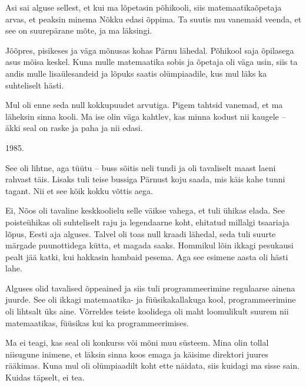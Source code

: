 
Asi sai alguse sellest, et kui ma lõpetasin põhikooli, siis 
matemaatikaõpetaja arvas, et peaksin minema Nõkku edasi õppima. Ta suutis mu vanemaid veenda, et see on suurepärane 
mõte, ja ma läksingi.


Jõõpres, pisikeses ja väga mõnusas kohas Pärnu 
lähedal. Põhikool saja õpilasega asus mõisa keskel. Kuna mulle matemaatika 
sobis ja õpetaja oli väga usin, siis ta andis mulle lisaülesandeid 
ja lõpuks saatis olümpiaadile, kus mul läks ka suhteliselt hästi.



Mul oli enne seda null kokkupuudet arvutiga. Pigem tahtsid vanemad, et ma läheksin sinna kooli. Ma ise olin väga kahtlev, kas minna kodust 
nii kaugele – äkki seal on raske ja paha ja nii edasi. 


1985. 


See oli lihtne, aga tüütu – buss sõitis neli tundi 
ja oli tavaliselt maast laeni rahvast täis. Lisaks tuli teise bussiga Pärnust koju saada, mis
käis kahe tunni tagant. Nii et see kõik kokku võttis aega.  


Ei, Nõos oli tavaline keskkoolielu selle väikse vahega, et tuli ühikas 
elada. See poisteühikas oli 
suhteliselt raju ja legendaarne koht, ehitatud millalgi tsaariaja lõpus, Eesti 
aja alguses. Talvel oli toas null kraadi lähedal, seda tuli suurte 
märgade puunottidega kütta, et magada saaks. Hommikul lõin ikkagi pesukausi pealt jää katki, 
kui hakkasin hambaid pesema. Aga see esimene aasta oli hästi lahe. 

Alguses olid tavalised õppeained ja siis tuli programmeerimine 
regulaarse ainena juurde. See oli ikkagi matemaatika- ja 
füüsikakallakuga kool, programmeerimine oli lihtsalt üks
aine. Võrreldes teiste koolidega oli maht loomulikult suurem nii 
matemaatikas, füüsikas kui ka programmeerimises.


Ma ei teagi, kas seal oli konkurss või mõni muu süsteem. Mina olin tollal niisugune inimene, et läksin sinna koos emaga ja käisime direktori juures rääkimas. Kuna mul oli 
olümpiaadilt koht ette näidata, siis kuidagi ma 
sisse sain. Kuidas täpselt, ei tea. 

